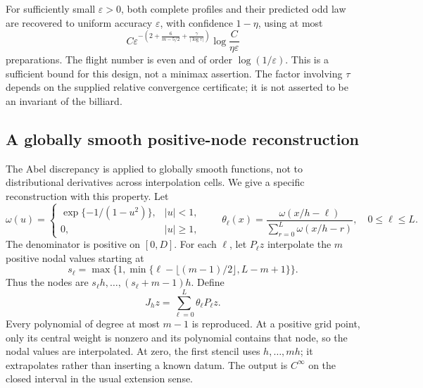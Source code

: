 \begin{corollary}
\label{cor:v11-budget}
For sufficiently small $\varepsilon>0$, both complete profiles and
their predicted odd law are recovered to uniform accuracy
$\varepsilon$, with confidence $1-\eta$, using at most
\begin{equation}\label{eq:v11-budget}
 C\varepsilon^{-\left(2+\frac{6}{m-5/2}
                       +\frac{\gamma}{|\log\tau|}\right)}
                         \log\frac{C}{\eta\varepsilon}
\end{equation}
preparations. The flight number is even and of order
$\log(1/\varepsilon)$. This is a sufficient bound for this design,
not a minimax assertion. The factor involving $\tau$ depends on the
supplied relative convergence certificate; it is not asserted to be
an invariant of the billiard.
\end{corollary}

\subsection{A globally smooth positive-node reconstruction}
The Abel discrepancy is applied to globally smooth functions, not to
distributional derivatives across interpolation cells. We give a
specific reconstruction with this property. Let
\[
 \omega(u)=\begin{cases}\exp\{-1/(1-u^2)\},&|u|<1,\\0,&|u|\ge1,
                \end{cases}\qquad
 \theta_\ell(x)=\frac{\omega(x/h-\ell)}
                     {\sum_{r=0}^L\omega(x/h-r)},\quad0\le\ell\le L.
\]
The denominator is positive on $[0,D]$. For each $\ell$, let
$P_\ell z$ interpolate the $m$ positive nodal values starting at
\[
 s_\ell=\max\{1,\min\{\ell-\lfloor(m-1)/2\rfloor,L-m+1\}\}.
\]
Thus the nodes are $s_\ell h,\ldots,(s_\ell+m-1)h$. Define
\begin{equation}\label{eq:v11-smooth-interpolator}
                   J_hz=\sum_{\ell=0}^L\theta_\ell P_\ell z.
\end{equation}
Every polynomial of degree at most $m-1$ is reproduced. At a positive
grid point, only its central weight is nonzero and its polynomial
contains that node, so the nodal values are interpolated. At zero,
the first stencil uses $h,\ldots,mh$; it extrapolates rather than
inserting a known datum. The output is $C^\infty$ on the closed
interval in the usual extension sense.

